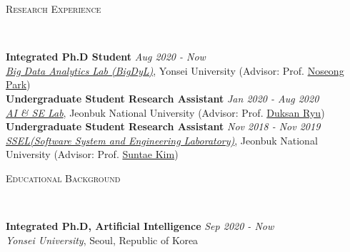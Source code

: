 \documentclass[10pt]{article}
\newenvironment{changemargin}[2]{
  \begin{list}{}{
    \setlength{\topsep}{0pt}
    \setlength{\leftmargin}{#1}
    \setlength{\rightmargin}{#2}
    \setlength{\listparindent}{\parindent}
    \setlength{\itemindent}{\parindent}
    \setlength{\parsep}{\parskip}
  }
  \item[]}{\end{list}
}
\newcommand{\lineover}{
	\begin{changemargin}{-0.05in}{-0.05in}
		\vspace*{-8pt}
		\hrulefill \\
		\vspace*{-2pt}
	\end{changemargin}
}
\newcommand{\header}[1]{
	\begin{changemargin}{-0.5in}{-0.5in}
		\scshape{#1}\\
  	\lineover
	\end{changemargin}
}
\newenvironment{body} {
	\vspace*{-16pt}
	\begin{changemargin}{-0.25in}{-0.5in}
  }
	{\end{changemargin}
}
\begin{document}
\header{Research Experience}
\begin{body}
	\vspace{14pt}
	\textbf{Integrated Ph.D Student} \hfill \emph{Aug 2020 - Now} \\
	\emph{\href{https://sites.google.com/view/npark}{Big Data Analytics Lab (BigDyL)}}, Yonsei University (Advisor: Prof. {\href{https://scholar.google.com/citations?user=VSuM3gYAAAAJ&hl=en}{Noseong Park}})  \\
	\textbf{Undergraduate Student Research Assistant} \hfill \emph{Jan 2020 - Aug 2020} \\
	\emph{\href{https://sites.google.com/view/aiselabjbnu}{AI \& SE Lab}}, Jeonbuk National University (Advisor: Prof. {\href{https://scholar.google.com/citations?user=BHue-MMAAAAJ&hl=en}{Duksan Ryu}})  \\
	\textbf{Undergraduate Student Research Assistant} \hfill \emph{Nov 2018 - Nov 2019} \\
	\emph{\href{https://sites.google.com/view/jbnussel/}{SSEL(Software System and Engineering Laboratory)}}, Jeonbuk National University (Advisor: Prof. {\href{https://scholar.google.com/citations?user=IN_HTKEAAAAJ&hl=en}{Suntae Kim}})  \\
\end{body}
\medskip

\header{Educational Background}

\begin{body}
	\vspace{14pt}
	\textbf{Integrated Ph.D, Artificial Intelligence} \hfill \emph{Sep 2020 -  Now} \\
	\emph{Yonsei University}, Seoul, Republic of Korea \\
\end{body}
\end{document}
